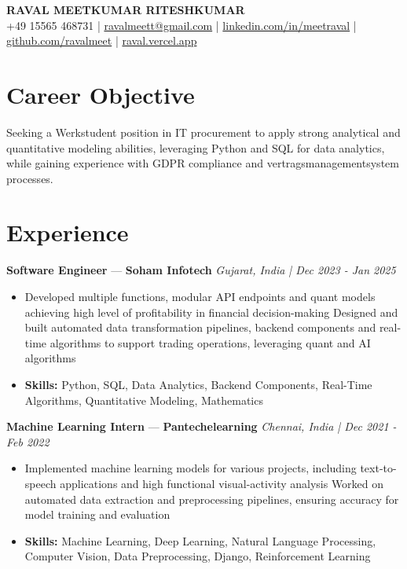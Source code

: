 \documentclass[a4paper,10pt]{article}
\begin{document}
\begin{center}
  {\Large\bfseries RAVAL MEETKUMAR RITESHKUMAR}\\[2pt]
  {\small +49 15565 468731 \;|\; \href{mailto:ravalmeett@gmail.com}{ravalmeett@gmail.com} \;|\; \href{https://www.linkedin.com/in/meetraval/}{linkedin.com/in/meetraval} \;|\; \href{https://github.com/ravalmeet}{github.com/ravalmeet} \;|\; \href{https://raval.vercel.app/}{raval.vercel.app}}
\end{center}
\vspace{-3pt}

\section*{Career Objective}
Seeking a Werkstudent position in IT procurement to apply strong analytical and quantitative modeling abilities, leveraging Python and SQL for data analytics, while gaining experience with GDPR compliance and vertragsmanagementsystem processes.\par

\section*{Experience}
\textbf{Software Engineer} — \textbf{Soham Infotech} \hfill \textit{Gujarat, India \;|\; Dec 2023 - Jan 2025}\par
\vspace{1pt}
\begin{itemize}
  \item Developed multiple functions, modular API endpoints and quant models achieving high level of profitability in financial decision-making Designed and built automated data transformation pipelines, backend components and real-time algorithms to support trading operations, leveraging quant and AI algorithms
  \item \textbf{Skills:} Python, SQL, Data Analytics, Backend Components, Real-Time Algorithms, Quantitative Modeling, Mathematics
\end{itemize}
\vspace{3pt}
\textbf{Machine Learning Intern} — \textbf{Pantechelearning} \hfill \textit{Chennai, India \;|\; Dec 2021 - Feb 2022}\par
\vspace{1pt}
\begin{itemize}
  \item Implemented machine learning models for various projects, including text-to-speech applications and high functional visual-activity analysis Worked on automated data extraction and preprocessing pipelines, ensuring accuracy for model training and evaluation
  \item \textbf{Skills:} Machine Learning, Deep Learning, Natural Language Processing, Computer Vision, Data Preprocessing, Django, Reinforcement Learning
\end{itemize}
\end{document}
